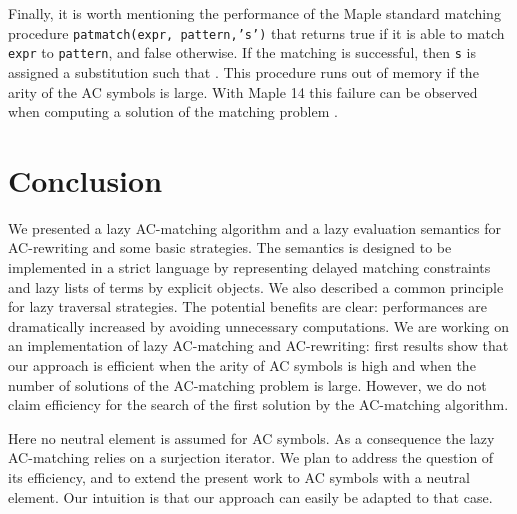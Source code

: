 \documentclass[submission,copyright,creativecommons]{eptcs}
\numberwithin{subcase}{case}
\begin{document}
Finally, it is worth mentioning the performance of the Maple standard matching
procedure \texttt{pat\-match(expr, pattern,'s')} that returns true if it is able
to match \texttt{expr} to \texttt{pattern}, and false otherwise. If the matching
is successful, then \texttt{s} is assigned a substitution such that .
This procedure runs out of memory if the arity of the AC symbols is large.
With Maple 14 this failure can be observed  when computing a solution of the
matching problem .


\section{Conclusion}
\label{conclusion:sec}
We presented a lazy AC-matching algorithm and a lazy evaluation semantics for
AC-rewriting and some basic strategies. The semantics is designed to be
implemented in a strict language by representing delayed matching
constraints and lazy lists of terms by explicit objects. We also described a
common principle for lazy traversal strategies. The potential benefits are
clear: performances are dramatically increased by avoiding unnecessary
computations. We are working on an implementation of lazy AC-matching and
AC-rewriting: first results show that our approach is  efficient when the arity
of AC symbols is high and when the number of solutions of the AC-matching
problem is large. However, we do not claim efficiency for the search of the
first solution by the AC-matching algorithm.


Here no neutral element is assumed for AC symbols. As a consequence the lazy
AC-matching relies on a surjection iterator. We plan to address the question of
its efficiency, and to extend the present work to AC symbols with a neutral
element. Our intuition is that our approach can easily be adapted to that
case.


\end{document}
